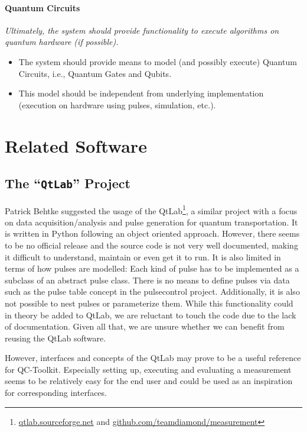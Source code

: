 \documentclass[a4paper,12pt]{article}
\begin{document}
\paragraph{Quantum Circuits}
\textit{Ultimately, the system should provide functionality to execute algorithms on quantum hardware (if possible).}
\begin{itemize} \itemsep-0.5pt
 \item The system should provide means to model (and possibly execute) Quantum Circuits, i.e., Quantum Gates and Qubits.
 \item This model should be independent from underlying implementation (execution on hardware using pulses, simulation, etc.).
\end{itemize}

\section{Related Software}
\subsection{The ``\texttt{QtLab}'' Project}
Patrick Behtke suggested the usage of the QtLab\footnote{\href{http://qtlab.sourceforge.net/}{qtlab.sourceforge.net} and \href{https://github.com/teamdiamond/measurement}{github.com/teamdiamond/measurement}}, a similar project with a focus on data acquisition/analysis and pulse generation for quantum transportation. It is written in Python following an object oriented approach. However, there seems to be no official release and the source code is not very well documented, making it difficult to understand, maintain or even get it to run. It is also limited in terms of how pulses are modelled: Each kind of pulse has to be implemented as a subclass of an abstract pulse class. There is no means to define pulses via data such as the pulse table concept in the pulsecontrol project. Additionally, it is also not possible to nest pulses or parameterize them. While this functionality could in theory be added to QtLab, we are reluctant to touch the code due to the lack of documentation. Given all that, we are unsure whether we can benefit from reusing the QtLab software.\par
However, interfaces and concepts of the QtLab may prove to be a useful reference for QC-Toolkit. Especially setting up, executing and evaluating a measurement seems to be relatively easy for the end user and could be used as an inspiration for corresponding interfaces.
\end{document}
